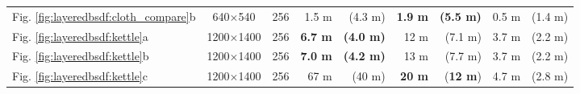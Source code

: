 \begin{table}[h]
\begin{tabular}{l|c|c|rr|rr|rr}
	Fig. \ref{fig:layeredbsdf:cloth_compare}b 	& 640$\times$540   & 256  & 1.5 m   		& (4.3 m) 			& \textbf{1.9 m}& \textbf{(5.5 m)}  & 0.5 m & (1.4 m)\\
	Fig. \ref{fig:layeredbsdf:kettle}a 			& 1200$\times$1400 & 256  & \textbf{6.7 m}  & \textbf{(4.0 m)} 	& 12 m  		& (7.1 m)   		& 3.7 m & (2.2 m)\\
	Fig. \ref{fig:layeredbsdf:kettle}b 			& 1200$\times$1400 & 256  & \textbf{7.0 m}  & \textbf{(4.2 m)} 	& 13 m  		& (7.7 m)   		& 3.7 m & (2.2 m)\\
	Fig. \ref{fig:layeredbsdf:kettle}c 			& 1200$\times$1400 & 256  & 67 m 			& (40 m) 			& \textbf{20 m} & (\textbf{12 m})  	& 4.7 m & (2.8 m)\\
	\end{tabular}
\end{table}

